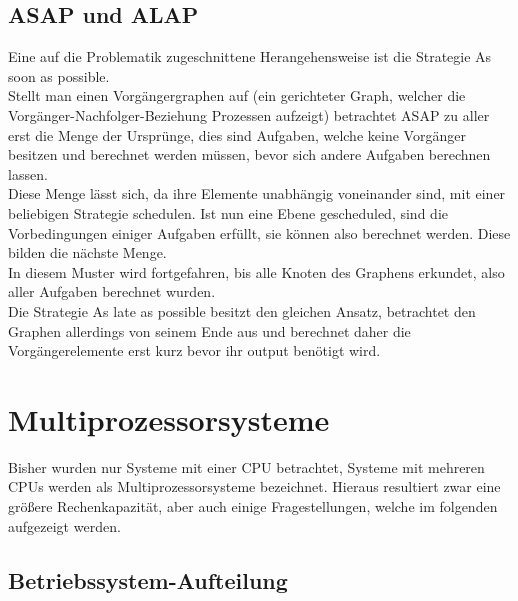 \subsection{ASAP und ALAP}
Eine auf die Problematik zugeschnittene Herangehensweise ist die Strategie As soon as possible. \\
Stellt man einen Vorgängergraphen auf (ein gerichteter Graph, welcher die Vorgänger-Nachfolger-Beziehung 
Prozessen aufzeigt) betrachtet ASAP zu aller erst die Menge der Ursprünge, dies sind Aufgaben, welche keine 
Vorgänger besitzen und berechnet werden müssen, bevor sich andere Aufgaben berechnen lassen. \\
Diese Menge lässt sich, da ihre Elemente unabhängig voneinander sind, mit einer beliebigen Strategie 
schedulen. Ist nun eine Ebene gescheduled, sind die Vorbedingungen einiger Aufgaben erfüllt, sie können 
also berechnet werden. Diese bilden die nächste Menge. \\
In diesem Muster wird fortgefahren, bis alle Knoten des Graphens erkundet, also aller Aufgaben berechnet 
wurden. \\
Die Strategie As late as possible besitzt den gleichen Ansatz, betrachtet den Graphen allerdings von seinem 
Ende aus und berechnet daher die Vorgängerelemente erst kurz bevor ihr output benötigt wird.
\\

\section{Multiprozessorsysteme}
Bisher wurden nur Systeme mit einer CPU betrachtet, Systeme mit mehreren CPUs werden als 
Multiprozessorsysteme bezeichnet. Hieraus resultiert zwar eine größere Rechenkapazität, aber auch einige 
Fragestellungen, welche im folgenden aufgezeigt werden.

\subsection{Betriebssystem-Aufteilung}
